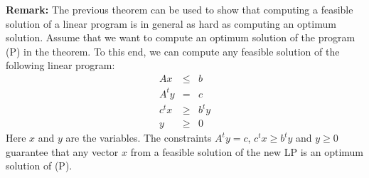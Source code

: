 \documentclass[12pt, showidx, twoside]{article}
\begin{document}
{{{{{\bf Remark:}
The previous theorem can be used to show that computing a 
feasible solution of a linear program is in general as hard
as computing an optimum solution. Assume that we want to compute
an optimum solution of the program (P) in the theorem.
To this end, we can compute any feasible solution of the 
following linear program:
\begin{equation}\label{eq::primal_dual}
\begin{array}{rcl}
 Ax    & \leq & b\\
                   A^t y &  =   & c\\
                   c^t x & \geq & b^ty\\
                   y     & \geq & 0
\end{array}
\end{equation}
Here $x$ and $y$ are the variables. 
The constraints $A^t y  =  c$, $c^t x \geq b^t y$ and $y \geq 0$
guarantee that any vector $x$ from a feasible solution of the
new LP is an optimum solution of (P).






}}}}
\end{document}
